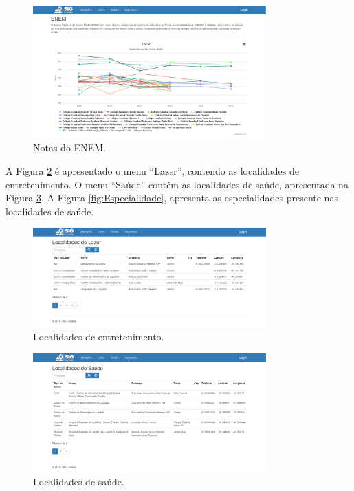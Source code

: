 \begin{figure}[h]
\centering
\includegraphics[width=0.80\textwidth]{./img/cap_IV/12-ENEM}
\caption{Notas do ENEM.}
\label{fig:ENEM}
\end{figure}

A Figura \ref{fig:Lazer} é apresentado o menu “Lazer”, contendo as localidades de entretenimento. O menu “Saúde” contém as localidades de saúde, apresentada na Figura \ref{fig:Saude}. A Figura \ref{fig:Especialidade}, apresenta as especialidades presente nas localidades de saúde.

\begin{figure}[h]
\centering
\includegraphics[width=0.80\textwidth]{./img/cap_IV/13-Lazer}
\caption{Localidades de entretenimento.}
\label{fig:Lazer}
\end{figure}

\begin{figure}[h]
\centering
\includegraphics[width=0.80\textwidth]{./img/cap_IV/14-Saude}
\caption{Localidades de saúde.}
\label{fig:Saude}
\end{figure}

